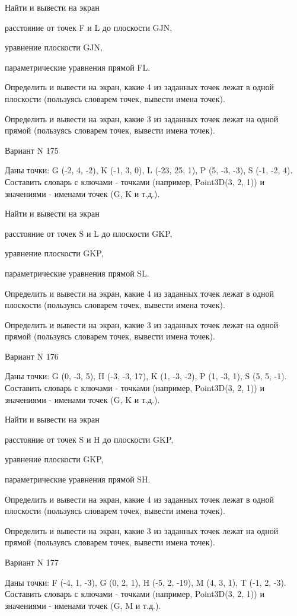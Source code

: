 \documentclass[11pt]{report}
\begin{document}
Найти и вывести на экран


расстояние от точек F и L до плоскости GJN,


уравнение плоскости GJN,


параметрические уравнения прямой FL.


Определить и вывести на экран, какие 4 из заданных точек лежат в одной плоскости (пользуясь словарем точек, вывести имена точек).


Определить и вывести на экран, какие 3 из заданных точек лежат на одной прямой (пользуясь словарем точек, вывести имена точек).

\newpage
Вариант N 175

Даны точки: G (-2, 4, -2), K (-1, 3, 0), L (-23, 25, 1), P (5, -3, -3), S (-1, -2, 4).
Составить словарь с ключами - точками (например, Point3D(3, 2, 1)) и значениями - именами точек (G, K и т.д.).


Найти и вывести на экран


расстояние от точек S и L до плоскости GKP,


уравнение плоскости GKP,


параметрические уравнения прямой SL.


Определить и вывести на экран, какие 4 из заданных точек лежат в одной плоскости (пользуясь словарем точек, вывести имена точек).


Определить и вывести на экран, какие 3 из заданных точек лежат на одной прямой (пользуясь словарем точек, вывести имена точек).

\newpage
Вариант N 176

Даны точки: G (0, -3, 5), H (-3, -3, 17), K (1, -3, -2), P (1, -3, 1), S (5, 5, -1).
Составить словарь с ключами - точками (например, Point3D(3, 2, 1)) и значениями - именами точек (G, K и т.д.).


Найти и вывести на экран


расстояние от точек S и H до плоскости GKP,


уравнение плоскости GKP,


параметрические уравнения прямой SH.


Определить и вывести на экран, какие 4 из заданных точек лежат в одной плоскости (пользуясь словарем точек, вывести имена точек).


Определить и вывести на экран, какие 3 из заданных точек лежат на одной прямой (пользуясь словарем точек, вывести имена точек).

\newpage
Вариант N 177

Даны точки: F (-4, 1, -3), G (0, 2, 1), H (-5, 2, -19), M (4, 3, 1), T (-1, 2, -3).
Составить словарь с ключами - точками (например, Point3D(3, 2, 1)) и значениями - именами точек (G, M и т.д.).
\end{document}
